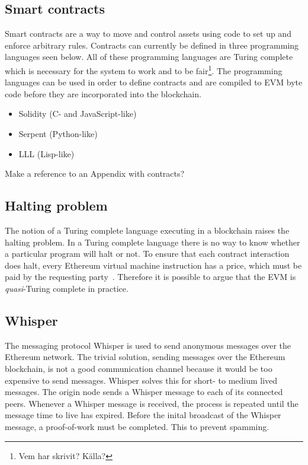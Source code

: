 \subsection{Smart contracts}
Smart contracts are a way to move and control assets using code to set up and enforce arbitrary rules. Contracts can currently be defined in three programming languages seen below. All of these programming languages are Turing complete which is necessary for the system to work and to be fair\footnote{Vem har skrivit? Källa?}. The programming languages can be used in order to define contracts and are compiled to EVM byte code before they are incorporated into the blockchain.

\begin{itemize}
    \item Solidity (C- and JavaScript-like)
    \item Serpent (Python-like)
    \item LLL (Lisp-like)
\end{itemize}

Make a reference to an Appendix with contracts?


\subsection{Halting problem}
The notion of a Turing complete language executing in a blockchain raises the halting problem. In a Turing complete language there is no way to know whether a particular program will halt or not. To ensure that each contract interaction does halt, every Ethereum virtual machine instruction has a price, which must be paid by the requesting party~\cite{ethereum:yellow}. Therefore it is possible to argue that the EVM is \emph{quasi}-Turing complete in practice.

\subsection{Whisper}
The messaging protocol Whisper is used to send anonymous messages over the Ethereum network. The trivial solution, sending messages over the Ethereum blockchain, is not a good communication channel because it would be too expensive to send messages. Whisper solves this for short- to medium lived messages. The origin node sends a Whisper message to each of its connected peers. Whenever a Whisper message is received, the process is repeated until the message time to live has expired. Before the inital broadcast of the Whisper message, a proof-of-work must be completed. This to prevent spamming.

